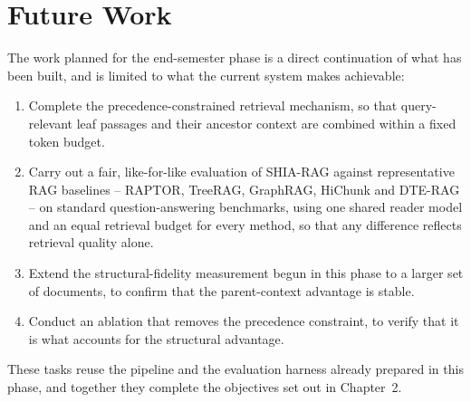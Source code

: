 \documentclass[12pt, a4paper, openright, twoside]{report}
\begin{document}
\section{Future Work}
The work planned for the end-semester phase is a direct continuation of what has been built, and is limited to what the current system makes achievable:
\begin{enumerate}
    \item Complete the precedence-constrained retrieval mechanism, so that query-relevant leaf passages and their ancestor context are combined within a fixed token budget.
    \item Carry out a fair, like-for-like evaluation of SHIA-RAG against representative RAG baselines -- RAPTOR, TreeRAG, GraphRAG, HiChunk and DTE-RAG -- on standard question-answering benchmarks, using one shared reader model and an equal retrieval budget for every method, so that any difference reflects retrieval quality alone.
    \item Extend the structural-fidelity measurement begun in this phase to a larger set of documents, to confirm that the parent-context advantage is stable.
    \item Conduct an ablation that removes the precedence constraint, to verify that it is what accounts for the structural advantage.
\end{enumerate}
These tasks reuse the pipeline and the evaluation harness already prepared in this phase, and together they complete the objectives set out in Chapter~2.
\end{document}
